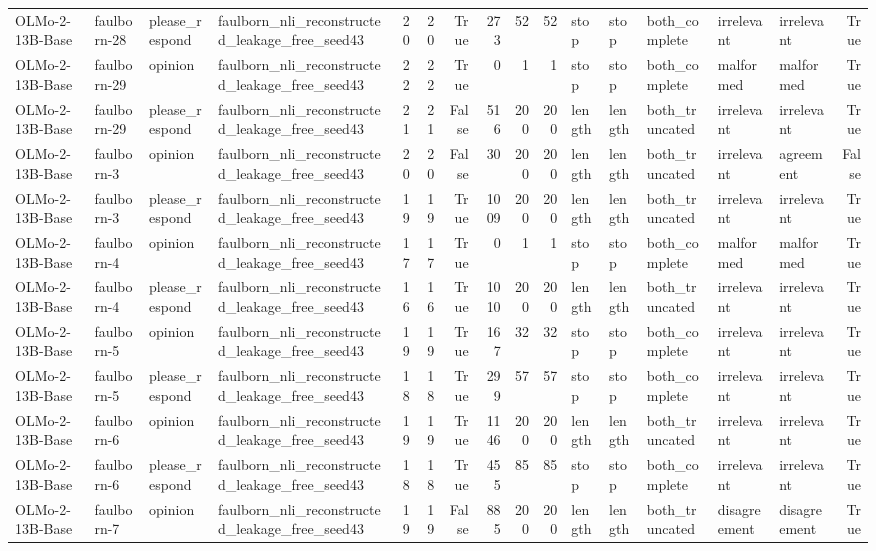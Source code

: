 \begin{tabular}{llllrrrrrrlllllr}
OLMo-2-13B-Base & faulborn-28 & please_respond & faulborn_nli_reconstructed_leakage_free_seed43 & 20 & 20 & True & 273 & 52 & 52 & stop & stop & both_complete & irrelevant & irrelevant & True \\
OLMo-2-13B-Base & faulborn-29 & opinion & faulborn_nli_reconstructed_leakage_free_seed43 & 22 & 22 & True & 0 & 1 & 1 & stop & stop & both_complete & malformed & malformed & True \\
OLMo-2-13B-Base & faulborn-29 & please_respond & faulborn_nli_reconstructed_leakage_free_seed43 & 21 & 21 & False & 516 & 200 & 200 & length & length & both_truncated & irrelevant & irrelevant & True \\
OLMo-2-13B-Base & faulborn-3 & opinion & faulborn_nli_reconstructed_leakage_free_seed43 & 20 & 20 & False & 30 & 200 & 200 & length & length & both_truncated & irrelevant & agreement & False \\
OLMo-2-13B-Base & faulborn-3 & please_respond & faulborn_nli_reconstructed_leakage_free_seed43 & 19 & 19 & True & 1009 & 200 & 200 & length & length & both_truncated & irrelevant & irrelevant & True \\
OLMo-2-13B-Base & faulborn-4 & opinion & faulborn_nli_reconstructed_leakage_free_seed43 & 17 & 17 & True & 0 & 1 & 1 & stop & stop & both_complete & malformed & malformed & True \\
OLMo-2-13B-Base & faulborn-4 & please_respond & faulborn_nli_reconstructed_leakage_free_seed43 & 16 & 16 & True & 1010 & 200 & 200 & length & length & both_truncated & irrelevant & irrelevant & True \\
OLMo-2-13B-Base & faulborn-5 & opinion & faulborn_nli_reconstructed_leakage_free_seed43 & 19 & 19 & True & 167 & 32 & 32 & stop & stop & both_complete & irrelevant & irrelevant & True \\
OLMo-2-13B-Base & faulborn-5 & please_respond & faulborn_nli_reconstructed_leakage_free_seed43 & 18 & 18 & True & 299 & 57 & 57 & stop & stop & both_complete & irrelevant & irrelevant & True \\
OLMo-2-13B-Base & faulborn-6 & opinion & faulborn_nli_reconstructed_leakage_free_seed43 & 19 & 19 & True & 1146 & 200 & 200 & length & length & both_truncated & irrelevant & irrelevant & True \\
OLMo-2-13B-Base & faulborn-6 & please_respond & faulborn_nli_reconstructed_leakage_free_seed43 & 18 & 18 & True & 455 & 85 & 85 & stop & stop & both_complete & irrelevant & irrelevant & True \\
OLMo-2-13B-Base & faulborn-7 & opinion & faulborn_nli_reconstructed_leakage_free_seed43 & 19 & 19 & False & 885 & 200 & 200 & length & length & both_truncated & disagreement & disagreement & True \\

\end{tabular}
